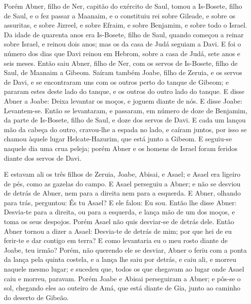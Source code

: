 Porém Abner, filho de Ner, capitão do exército de Saul, tomou a
Is-Bosete, filho de Saul, e o fez passar a Maanaim, e o
constituiu rei sobre Gileade, e sobre os assuritas, e sobre Jizreel,
e sobre Efraim, e sobre Benjamim, e sobre todo o Israel. Da
idade de quarenta anos era Is-Bosete, filho de Saul, quando começou
a reinar sobre Israel, e reinou dois anos; mas os da casa de Judá
seguiam a Davi. E foi o número dos dias que Davi reinou em
Hebrom, sobre a casa de Judá, sete anos e seis meses. Então
saiu Abner, filho de Ner, com os servos de Is-Bosete, filho de Saul,
de Maanaim a Gibeom. Saíram também Joabe, filho de Zeruia, e
os servos de Davi, e se encontraram uns com os outros perto do
tanque de Gibeom; e pararam estes deste lado do tanque, e os outros
do outro lado do tanque. E disse Abner a Joabe: Deixa
levantar os moços, e joguem diante de nós. E disse Joabe:
Levantem-se. Então se levantaram, e passaram, em número de
doze de Benjamim, da parte de Is-Bosete, filho de Saul, e doze dos
servos de Davi. E cada um lançou mão da cabeça do outro,
cravou-lhe a espada no lado, e caíram juntos, por isso se chamou
àquele lugar Helcate-Hazurim, que está junto a Gibeom. E
seguiu-se naquele dia uma crua peleja; porém Abner e os homens de
Israel foram feridos diante dos servos de Davi.

E estavam ali os três filhos de Zeruia, Joabe, Abisai, e Asael; e
Asael era ligeiro de pés, como as gazelas do campo. E Asael
perseguiu a Abner; e não se desviou de detrás de Abner, nem para a
direita nem para a esquerda. E Abner, olhando para trás,
perguntou: És tu Asael? E ele falou: Eu sou. Então lhe disse
Abner: Desvia-te para a direita, ou para a esquerda, e lança mão de
um dos moços, e toma os seus despojos. Porém Asael não quis
desviar-se de detrás dele. Então Abner tornou a dizer a
Asael: Desvia-te de detrás de mim; por que hei de eu ferir-te e dar
contigo em terra? E como levantaria eu o meu rosto diante de Joabe,
teu irmão? Porém, não querendo ele se desviar, Abner o feriu
com a ponta da lança pela quinta costela, e a lança lhe saiu por
detrás, e caiu ali, e morreu naquele mesmo lugar; e sucedeu que,
todos os que chegavam ao lugar onde Asael caiu e morreu, paravam.
Porém Joabe e Abisai perseguiram a Abner; e pôs-se o sol,
chegando eles ao outeiro de Amá, que está diante de Gia, junto ao
caminho do deserto de Gibeão.

